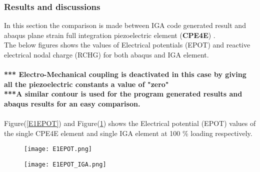 \documentclass[11pt]{article}
\begin{document}
\subsubsection{Results and discussions}
In this section the comparison is made between IGA code generated result and abaqus plane strain full integration piezoelectric element (\textbf{CPE4E}) \cite{abaqus10version}.\\The below figures shows the values of Electrical potentials (EPOT) and reactive electrical nodal charge (RCHG) for both abaqus and IGA element.\\
\\\textbf{*** Electro-Mechanical coupling is deactivated in this case by giving all the piezoelectric constants a value of "zero"  }
\\
\textbf{***A similar contour is used for the program generated results and abaqus results for an easy comparison. }\\
\\
Figure(\ref{E1EPOT}) and Figure(\ref{E1EPOT_IGA}) shows the Electrical potential (EPOT) values of the single CPE4E element and single IGA element at 100 \% loading respectively. \\
\begin{figure}[H]
	\centering
	\begin{minipage}{.5\textwidth}
		\centering
		\texttt{[image: E1EPOT.png]}
		\label{E1EPOT}
	\end{minipage}%
	\begin{minipage}{.5\textwidth}
		\centering
		\texttt{[image: E1EPOT\_IGA.png]}
		\label{E1EPOT_IGA}
	\end{minipage}
\end{figure}
\begin{comment}
\begin{figure}[H]
\begin{center}
\texttt{[image: xyz.png]} 
\caption{\\CPE4 Element U1}\label{xyz}
\end{center}	
\end{figure}

\begin{figure}[H]
\begin{center}
\texttt{[image: Figure\_1.png]} 
\caption{\\IGA Element U1}\label{Figure_1}
\end{center}	
\end{figure}
\end{comment}
\end{document}
